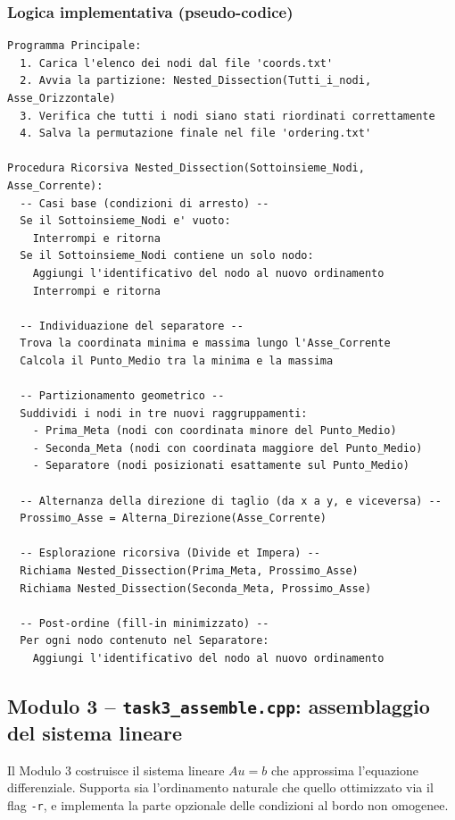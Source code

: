 \documentclass[a4paper,12pt]{article}
\begin{document}
\subsubsection*{Logica implementativa (pseudo-codice)}
\begin{minipage}{\linewidth}
\begin{lstlisting}
Programma Principale:
  1. Carica l'elenco dei nodi dal file 'coords.txt'
  2. Avvia la partizione: Nested_Dissection(Tutti_i_nodi, Asse_Orizzontale)
  3. Verifica che tutti i nodi siano stati riordinati correttamente
  4. Salva la permutazione finale nel file 'ordering.txt'

Procedura Ricorsiva Nested_Dissection(Sottoinsieme_Nodi, Asse_Corrente):
  -- Casi base (condizioni di arresto) --
  Se il Sottoinsieme_Nodi e' vuoto:
    Interrompi e ritorna
  Se il Sottoinsieme_Nodi contiene un solo nodo:
    Aggiungi l'identificativo del nodo al nuovo ordinamento
    Interrompi e ritorna

  -- Individuazione del separatore --
  Trova la coordinata minima e massima lungo l'Asse_Corrente
  Calcola il Punto_Medio tra la minima e la massima

  -- Partizionamento geometrico --
  Suddividi i nodi in tre nuovi raggruppamenti:
    - Prima_Meta (nodi con coordinata minore del Punto_Medio)
    - Seconda_Meta (nodi con coordinata maggiore del Punto_Medio)
    - Separatore (nodi posizionati esattamente sul Punto_Medio)

  -- Alternanza della direzione di taglio (da x a y, e viceversa) --
  Prossimo_Asse = Alterna_Direzione(Asse_Corrente)

  -- Esplorazione ricorsiva (Divide et Impera) --
  Richiama Nested_Dissection(Prima_Meta, Prossimo_Asse)
  Richiama Nested_Dissection(Seconda_Meta, Prossimo_Asse)

  -- Post-ordine (fill-in minimizzato) --
  Per ogni nodo contenuto nel Separatore:
    Aggiungi l'identificativo del nodo al nuovo ordinamento
\end{lstlisting}
\end{minipage}

\clearpage
\subsection*{Modulo 3 -- \texttt{task3\_assemble.cpp}: assemblaggio del sistema lineare}

Il Modulo 3 costruisce il sistema lineare $Au = b$ che approssima l'equazione differenziale. Supporta sia l'ordinamento naturale che quello ottimizzato via il flag \texttt{-r}, e implementa la parte opzionale delle condizioni al bordo non omogenee.
\end{document}
